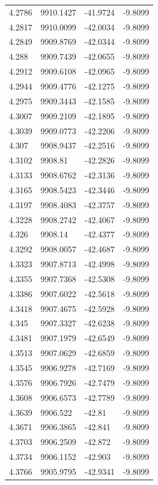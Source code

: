 \begin{table}[H]
\begin{tabular}{llll}
4.2786 & 9910.1427 & -41.9724 & -9.8099 \\
4.2817 & 9910.0099 & -42.0034 & -9.8099 \\
4.2849 & 9909.8769 & -42.0344 & -9.8099 \\
4.288 & 9909.7439 & -42.0655 & -9.8099 \\
4.2912 & 9909.6108 & -42.0965 & -9.8099 \\
4.2944 & 9909.4776 & -42.1275 & -9.8099 \\
4.2975 & 9909.3443 & -42.1585 & -9.8099 \\
4.3007 & 9909.2109 & -42.1895 & -9.8099 \\
4.3039 & 9909.0773 & -42.2206 & -9.8099 \\
4.307 & 9908.9437 & -42.2516 & -9.8099 \\
4.3102 & 9908.81 & -42.2826 & -9.8099 \\
4.3133 & 9908.6762 & -42.3136 & -9.8099 \\
4.3165 & 9908.5423 & -42.3446 & -9.8099 \\
4.3197 & 9908.4083 & -42.3757 & -9.8099 \\
4.3228 & 9908.2742 & -42.4067 & -9.8099 \\
4.326 & 9908.14 & -42.4377 & -9.8099 \\
4.3292 & 9908.0057 & -42.4687 & -9.8099 \\
4.3323 & 9907.8713 & -42.4998 & -9.8099 \\
4.3355 & 9907.7368 & -42.5308 & -9.8099 \\
4.3386 & 9907.6022 & -42.5618 & -9.8099 \\
4.3418 & 9907.4675 & -42.5928 & -9.8099 \\
4.345 & 9907.3327 & -42.6238 & -9.8099 \\
4.3481 & 9907.1979 & -42.6549 & -9.8099 \\
4.3513 & 9907.0629 & -42.6859 & -9.8099 \\
4.3545 & 9906.9278 & -42.7169 & -9.8099 \\
4.3576 & 9906.7926 & -42.7479 & -9.8099 \\
4.3608 & 9906.6573 & -42.7789 & -9.8099 \\
4.3639 & 9906.522 & -42.81 & -9.8099 \\
4.3671 & 9906.3865 & -42.841 & -9.8099 \\
4.3703 & 9906.2509 & -42.872 & -9.8099 \\
4.3734 & 9906.1152 & -42.903 & -9.8099 \\
4.3766 & 9905.9795 & -42.9341 & -9.8099 \\

\end{tabular}
\end{table}
